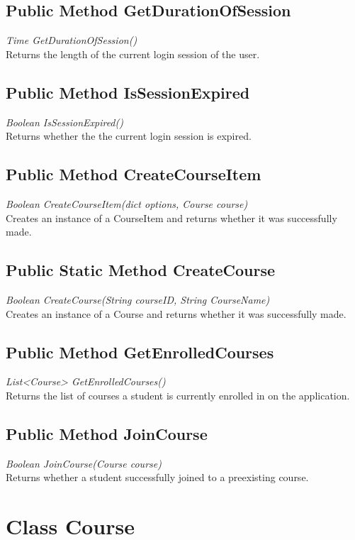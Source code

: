 \documentclass[16pt]{scrreprt}
\begin{document}
\subsection{Public Method GetDurationOfSession}
\textit{Time GetDurationOfSession()} \\
Returns the length of the current login session of the user.

\subsection{Public Method IsSessionExpired}
\textit{Boolean IsSessionExpired()} \\
Returns whether the the current login session is expired.

\subsection{Public Method CreateCourseItem}
\textit{Boolean CreateCourseItem(dict options, Course course)} \\
Creates an instance of a CourseItem and returns whether it was successfully made.

\subsection{Public Static Method CreateCourse}
\textit{Boolean CreateCourse(String courseID, String CourseName)} \\
Creates an instance of a Course and returns whether it was	 successfully made.

\subsection{Public Method GetEnrolledCourses}
\textit{List<Course> GetEnrolledCourses()} \\
Returns the list of courses a student is currently enrolled in on the application.

\subsection{Public Method JoinCourse}
\textit{Boolean JoinCourse(Course course)} \\
Returns whether a student successfully joined to a preexisting course.

\section{Class Course}
\end{document}
